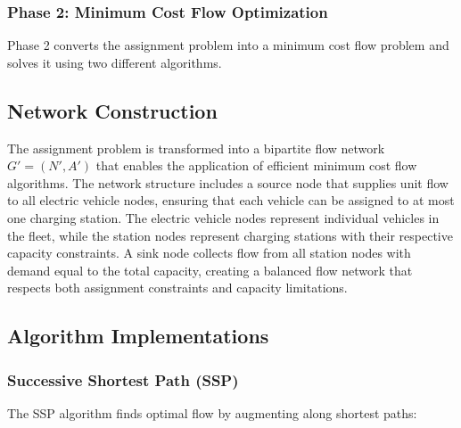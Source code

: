 \documentclass[12pt,a4paper]{article}
\begin{document}
\subsubsection{Phase 2: Minimum Cost Flow Optimization}

Phase 2 converts the assignment problem into a minimum cost flow problem and solves it using two different algorithms.

\subsection{Network Construction}

The assignment problem is transformed into a bipartite flow network $G' = (N', A')$ that enables the application of efficient minimum cost flow algorithms. The network structure includes a source node that supplies unit flow to all electric vehicle nodes, ensuring that each vehicle can be assigned to at most one charging station. The electric vehicle nodes represent individual vehicles in the fleet, while the station nodes represent charging stations with their respective capacity constraints. A sink node collects flow from all station nodes with demand equal to the total capacity, creating a balanced flow network that respects both assignment constraints and capacity limitations.

\subsection{Algorithm Implementations}

\subsubsection{Successive Shortest Path (SSP)}

The SSP algorithm finds optimal flow by augmenting along shortest paths:
\end{document}
